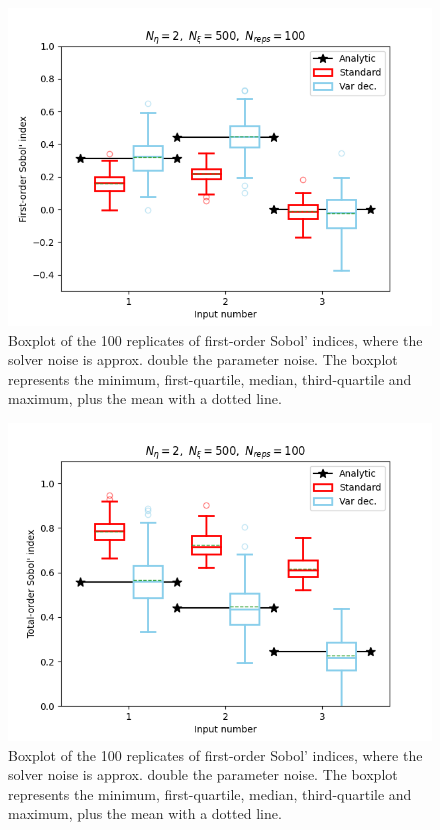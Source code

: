 \begin{figure}
    \centering
    \includegraphics{figures/large_c/si_eta2_xi500.png}
    \caption{Boxplot of the 100 replicates of first-order Sobol’ indices, where the solver noise is approx. double the parameter noise. The boxplot represents the minimum, first-quartile, median, third-quartile and maximum, plus the mean with a dotted line.}
    \label{fig:largec-eta2-si}
\end{figure}
\begin{figure}
    \centering
    \includegraphics{figures/large_c/ti_eta2_xi500.png}
    \caption{Boxplot of the 100 replicates of first-order Sobol’ indices, where the solver noise is approx. double the parameter noise. The boxplot represents the minimum, first-quartile, median, third-quartile and maximum, plus the mean with a dotted line.}
    \label{fig:largec-eta2-ti}
\end{figure}

